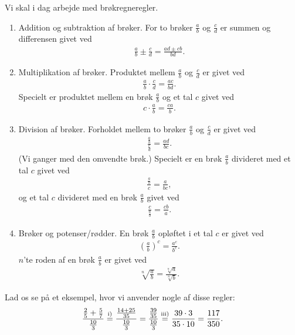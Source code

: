 Vi skal i dag arbejde med brøkregneregler.
\begin{enumerate}[label=\roman*)]
\item Addition og subtraktion af brøker. For to brøker $\frac{a}{b}$ og $\frac{c}{d}$ er summen og differensen givet ved
\begin{align*}
\frac{a}{b} \pm \frac{c}{d} = \frac{ad\pm cb}{bd}.
\end{align*}
\item Multiplikation af brøker. Produktet mellem $\frac{a}{b}$ og $\frac{c}{d}$ er givet ved
\begin{align*}
\frac{a}{b}\cdot \frac{c}{d} = \frac{ac}{bd}.
\end{align*}
Specielt er produktet mellem en brøk $\frac{a}{b}$ og et tal $c$ givet ved
\begin{align*}
c\cdot \frac{a}{b} = \frac{ca}{b}.
\end{align*}
\item Division af brøker. Forholdet mellem to brøker $\frac{a}{b}$ og $\frac{c}{d}$ er givet ved
\begin{align*}
\frac{\frac{a}{b}}{\frac{c}{d}} = \frac{ad}{bc}.
\end{align*}
(Vi ganger med den omvendte brøk.) Specielt er en brøk $\frac{a}{b}$ divideret med et tal $c$ givet ved
\begin{align*}
\frac{\frac{a}{b}}{c} = \frac{a}{bc},
\end{align*}
og et tal $c$ divideret med en brøk $\frac{a}{b}$ givet ved
\begin{align*}
\frac{c}{\frac{a}{b}} = \frac{cb}{a}.
\end{align*}
\item Brøker og potenser/rødder. En brøk $\frac{a}{b}$ opløftet i et tal $c$ er givet ved 
\begin{align*}
\left(\frac{a}{b}\right)^{c} = \frac{a^c}{b^c}.
\end{align*}
$n$'te roden af en brøk $\frac{a}{b}$ er givet ved 
\begin{align*}
\sqrt[n]{\frac{a}{b}} = \frac{\sqrt[n]{a}}{\sqrt[n]{b}}.
\end{align*}
\end{enumerate}
\begin{exa}
Lad os se på et eksempel, hvor vi anvender nogle af disse regler:
\begin{align*}
\frac{\frac{2}{5}+\frac{5}{7}}{\frac{10}{3}} \overset{\textnormal{i)}}{=} \frac{\frac{14+25}{35}}{\frac{10}{3}} = \frac{\frac{39}{35}}{\frac{10}{3}} \overset{\textnormal{iii)}}{=} \frac{39\cdot 3}{35 \cdot 10} = \frac{117}{350}.
\end{align*}
\end{exa}

